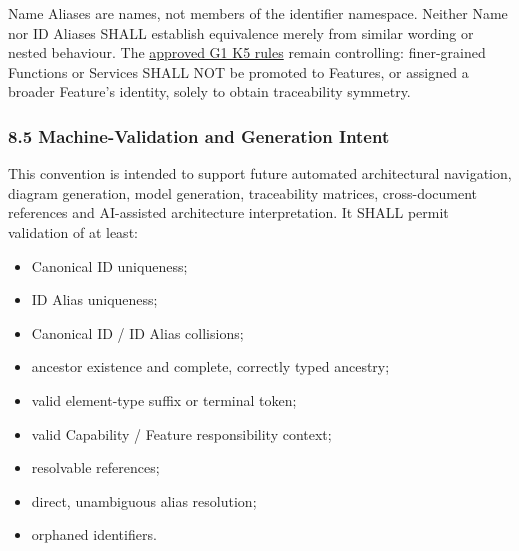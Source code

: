 \label{rad:metamodel:417}

Name Aliases are names, not members of the identifier namespace. Neither Name nor ID Aliases SHALL establish equivalence merely from similar wording or nested behaviour. The \href{https://github.com/fhirfactory/harmonia/blob/98410db60155198a75f74c79d98060070209faa1/docs/markdown/04-information-architecture/reviews/package2-g1-review.md\#65-metamodel-guardrail}{approved G1 K5 rules} remain controlling: finer-grained Functions or Services SHALL NOT be promoted to Features, or assigned a broader Feature's identity, solely to obtain traceability symmetry.

\label{rad:metamodel:419}
\subsubsection*{8.5 Machine-Validation and Generation Intent}
\label{rad:metamodel:421}

This convention is intended to support future automated architectural navigation, diagram generation, model generation, traceability matrices, cross-document references and AI-assisted architecture interpretation. It SHALL permit validation of at least:

\label{rad:metamodel:423}

\begin{itemize}

\item 
Canonical ID uniqueness;



\item 
ID Alias uniqueness;



\item 
Canonical ID /\allowbreak{} ID Alias collisions;



\item 
ancestor existence and complete, correctly typed ancestry;



\item 
valid element-type suffix or terminal token;



\item 
valid Capability /\allowbreak{} Feature responsibility context;



\item 
resolvable references;



\item 
direct, unambiguous alias resolution;



\item 
orphaned identifiers.



\end{itemize}
\label{rad:metamodel:433}

